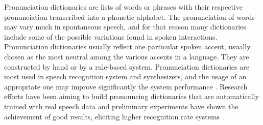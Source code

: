 %
%
%
%


Pronunciation dictionaries are lists of words or phrases with their
respective pronunciation transcribed into a phonetic alphabet.
The pronunciation of words may vary much in spontaneous speech,
and for that reason many dictionaries include some of the possible variations
found in spoken interactions. Pronunciation dictionaries usually reflect
one particular spoken accent, usually chosen as the most neutral 
among the various accents in a language. They are constructed by hand
or by a rule-based system. Pronunciation dictionaries are most used in
speech recognition system and synthesizers, and the usage of an appropriate
one may improve significantly the system performance \citep{lamel1996}.
Research efforts have been aiming to build pronouncing dictionaries that are 
automatically trained with real speech data and preliminary experiments
have shown the achievement of good results, eliciting higher recognition
rate systems \citep{fukada97}.

